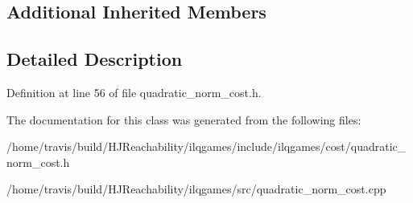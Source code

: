 \subsection*{Additional Inherited Members}


\subsection{Detailed Description}


Definition at line 56 of file quadratic\+\_\+norm\+\_\+cost.\+h.



The documentation for this class was generated from the following files\+:\begin{DoxyCompactItemize}
\item 
/home/travis/build/\+H\+J\+Reachability/ilqgames/include/ilqgames/cost/quadratic\+\_\+norm\+\_\+cost.\+h\item 
/home/travis/build/\+H\+J\+Reachability/ilqgames/src/quadratic\+\_\+norm\+\_\+cost.\+cpp\end{DoxyCompactItemize}
